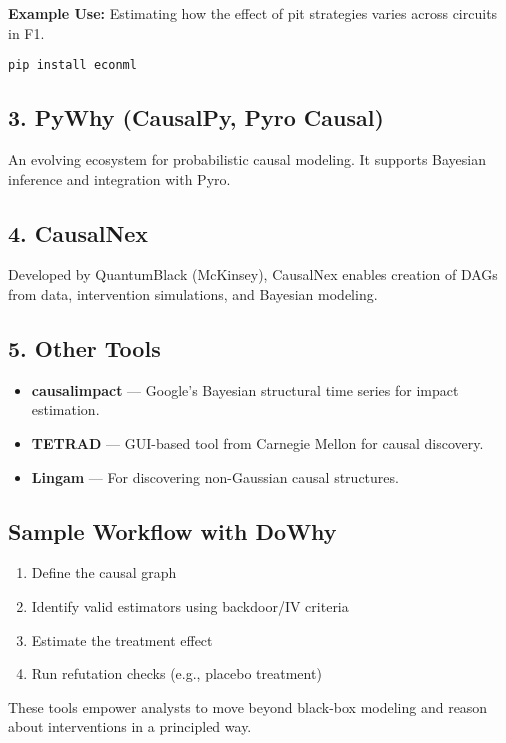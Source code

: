 \documentclass[12pt]{book}
\begin{document}
\textbf{Example Use:} Estimating how the effect of pit strategies varies across circuits in F1.

\texttt{pip install econml}

\subsection*{3. PyWhy (CausalPy, Pyro Causal)}

An evolving ecosystem for probabilistic causal modeling. It supports Bayesian inference and integration with Pyro.

\subsection*{4. CausalNex}

Developed by QuantumBlack (McKinsey), CausalNex enables creation of DAGs from data, intervention simulations, and Bayesian modeling.

\subsection*{5. Other Tools}

\begin{itemize}
    \item \textbf{causalimpact} — Google's Bayesian structural time series for impact estimation.
    \item \textbf{TETRAD} — GUI-based tool from Carnegie Mellon for causal discovery.
    \item \textbf{Lingam} — For discovering non-Gaussian causal structures.
\end{itemize}

\subsection*{Sample Workflow with DoWhy}

\begin{enumerate}
    \item Define the causal graph
    \item Identify valid estimators using backdoor/IV criteria
    \item Estimate the treatment effect
    \item Run refutation checks (e.g., placebo treatment)
\end{enumerate}

These tools empower analysts to move beyond black-box modeling and reason about interventions in a principled way.
\end{document}
